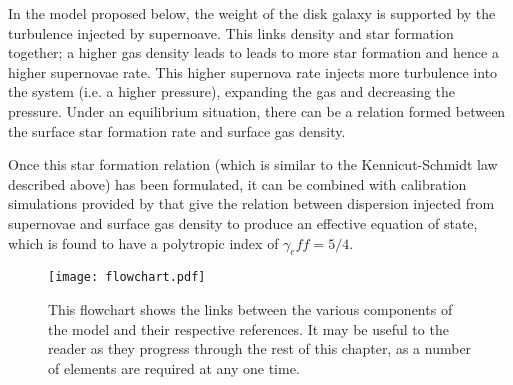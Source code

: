 In the model proposed below, the weight of the disk galaxy is supported by the turbulence injected by supernoave.
This links density and star formation together; a higher gas density leads to leads to more star formation and hence a higher supernovae rate.
This higher supernova rate injects more turbulence into the system (i.e. a higher pressure), expanding the gas and decreasing the pressure.
Under an equilibrium situation, there can be a relation formed between the surface star formation rate and surface gas density.

Once this star formation relation (which is similar to the Kennicut-Schmidt law described above) has been formulated, it can be combined with calibration simulations provided by \citet{martizzi_supernova_2015} that give the relation between dispersion injected from supernovae and surface gas density to produce an effective equation of state, which is found to have a polytropic index of $\gamma_eff = 5/4$.

\begin{figure}[!ht]
    \centering
    \texttt{[image: flowchart.pdf]}
    \caption{This flowchart shows the links between the various components of the model and their respective references.
    It may be useful to the reader as they progress through the rest of this chapter, as a number of elements are required at any one time.}
    \label{fig:flowchart}
\end{figure}
